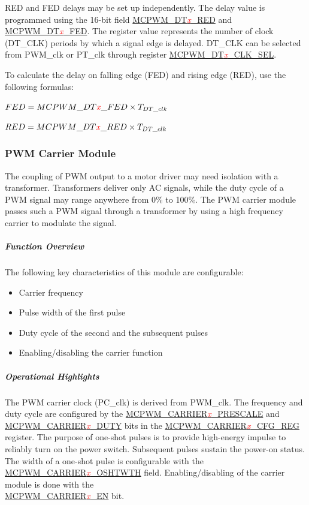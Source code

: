 \documentclass[main\_\_EN.tex]{subfiles}
\begin{document}
RED and FED delays may be set up independently. The delay value is programmed using the 16-bit field \hyperref[fielddesc:MCPWMDT0RED]{MCPWM\_DT\textcolor{red}{\it{x}}\_RED} and \hyperref[fielddesc:MCPWMDT0FED]{MCPWM\_DT\textcolor{red}{\it{x}}\_FED}. The register value represents the number of clock (DT\_CLK) periods by which a signal edge is delayed. DT\_CLK can be selected from PWM\_clk or PT\_clk through register \hyperref[fielddesc:MCPWMDT0CLKSEL]{MCPWM\_DT\textcolor{red}{\it{x}}\_CLK\_SEL}. 

To calculate the delay on falling edge (FED) and rising edge (RED), use the following formulas:
\begin{center}
    \item $FED = MCPWM\_DT\textcolor{red}{\it{x}}\_FED \times T_{DT\_clk}$
    \item $RED = MCPWM\_DT\textcolor{red}{\it{x}}\_RED \times T_{DT\_clk}$
\end{center}

\clearpage

\subsubsection{PWM Carrier Module}
The coupling of PWM output to a motor driver may need isolation with a transformer. Transformers deliver only AC signals, while the duty cycle of a PWM signal may range anywhere from 0\% to 100\%. The PWM carrier module passes such a PWM signal through a transformer by using a high frequency carrier to modulate the signal.

\subparagraph{Function Overview}
The following key characteristics of this module are configurable:
\begin{itemize}
    \item Carrier frequency
    \item Pulse width of the first pulse
    \item Duty cycle of the second and the subsequent pulses
    \item Enabling/disabling the carrier function
\end{itemize}

\subparagraph{Operational Highlights}
The PWM carrier clock (PC\_clk) is derived from PWM\_clk. The frequency and duty cycle are configured by the \hyperref[fielddesc:MCPWMCARRIER1PRESCALE]{MCPWM\_CARRIER\textcolor{red}{\it{x}}\_PRESCALE} and \hyperref[fielddesc:MCPWMCARRIER1DUTY]{MCPWM\_CARRIER\textcolor{red}{\it{x}}\_DUTY} bits in the \hyperref[regdesc:MCPWMCARRIER0CFGREG]{MCPWM\_CARRIER\textcolor{red}{\it{x}}\_CFG\_REG} register. The purpose of one-shot pulses is to provide high-energy impulse to reliably turn on the power switch. Subsequent pulses sustain the power-on status. The width of a one-shot pulse is configurable with the\\ \hyperref[fielddesc:MCPWMCARRIER1OSHTWTH]{MCPWM\_CARRIER\textcolor{red}{\it{x}}\_OSHTWTH} field. Enabling/disabling of the carrier module is done with the\\ \hyperref[fielddesc:MCPWMCARRIER0EN]{MCPWM\_CARRIER\textcolor{red}{\it{x}}\_EN} bit.
\end{document}
